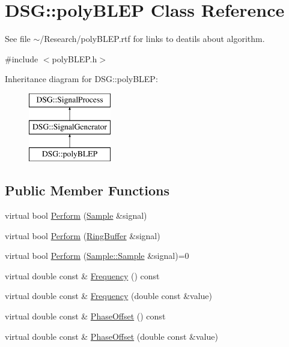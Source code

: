 \hypertarget{classDSG_1_1polyBLEP}{\section{D\+S\+G\+:\+:poly\+B\+L\+E\+P Class Reference}
\label{classDSG_1_1polyBLEP}
}


See file $\sim$/\+Research/poly\+B\+L\+E\+P.rtf for links to deatils about algorithm.  




{\ttfamily \#include $<$poly\+B\+L\+E\+P.\+h$>$}

Inheritance diagram for D\+S\+G\+:\+:poly\+B\+L\+E\+P\+:\begin{figure}[H]
\begin{center}
\leavevmode
\includegraphics[height=3.000000cm]{classDSG_1_1polyBLEP}
\end{center}
\end{figure}
\subsection*{Public Member Functions}
\begin{DoxyCompactItemize}
\item 
virtual bool \hyperlink{classDSG_1_1SignalGenerator_a95d485b68d874938ac93644b121607b9}{Perform} (\hyperlink{classDSG_1_1Sample}{Sample} \&signal)
\item 
virtual bool \hyperlink{classDSG_1_1SignalGenerator_abaa9aecd00b792d46166b91524b42db6}{Perform} (\hyperlink{classDSG_1_1RingBuffer}{Ring\+Buffer} \&signal)
\item 
virtual bool \hyperlink{classDSG_1_1SignalProcess_afdb8220100418893950c1161dd24db67}{Perform} (\hyperlink{classDSG_1_1Sample_aaf2e30d73911eccea99b53eeee15b612}{Sample\+::\+Sample} \&signal)=0
\item 
virtual double const \& \hyperlink{classDSG_1_1SignalGenerator_aedac746c5a70818d120858542ecb7c45}{Frequency} () const 
\item 
virtual double const \& \hyperlink{classDSG_1_1SignalGenerator_ae3ce8d45bafabbd86a0f535b15c3cd46}{Frequency} (double const \&value)
\item 
virtual double const \& \hyperlink{classDSG_1_1SignalGenerator_a1ce521847edd0b837fd840998f906b4b}{Phase\+Offset} () const 
\item 
virtual double const \& \hyperlink{classDSG_1_1SignalGenerator_a08b71b1f30ba65e629642c570291dc0e}{Phase\+Offset} (double const \&value)
\end{DoxyCompactItemize}
